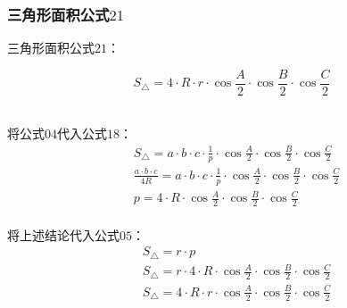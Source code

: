 \documentclass[UTF8]{ctexart}
\begin{document}
\subsubsection{三角形面积公式$21$}
    三角形面积公式$21$：
    \begin{large}
        \begin{equation*}
            S_{\triangle}=4\cdot R\cdot r\cdot\cos{\frac{A}{2}}\cdot\cos{\frac{B}{2}}\cdot\cos{\frac{C}{2}}
        \end{equation*}
    \end{large}\\
    将公式$04$代入公式$18$：
    \setcounter{equation}{0}
    \begin{align}
        &S_{\triangle}=a\cdot b\cdot c\cdot \frac{1}{p}\cdot\cos{\frac{A}{2}}\cdot\cos{\frac{B}{2}}\cdot\cos{\frac{C}{2}}\\[3mm]
        &\frac{a\cdot b\cdot c}{4R}=a\cdot b\cdot c\cdot \frac{1}{p}\cdot\cos{\frac{A}{2}}\cdot\cos{\frac{B}{2}}\cdot\cos{\frac{C}{2}}\\[3mm]
        &p=4\cdot R\cdot\cos{\frac{A}{2}}\cdot\cos{\frac{B}{2}}\cdot\cos{\frac{C}{2}}
    \end{align}\\
    将上述结论代入公式$05$：
    \begin{align}
        &S_{\triangle}=r\cdot p\\[3mm]
        &S_{\triangle}=r\cdot 4\cdot R\cdot\cos{\frac{A}{2}}\cdot\cos{\frac{B}{2}}\cdot\cos{\frac{C}{2}}\\[3mm]
        &S_{\triangle}=4\cdot R\cdot r\cdot\cos{\frac{A}{2}}\cdot\cos{\frac{B}{2}}\cdot\cos{\frac{C}{2}}
    \end{align}

\newpage
\end{document}

